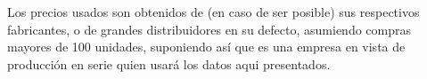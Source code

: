 Los precios usados son obtenidos de (en caso de ser posible) sus respectivos
fabricantes, o de grandes distribuidores en su defecto, asumiendo compras
mayores de 100 unidades, suponiendo as\'i que es una empresa en vista de
producci\'on en serie quien usar\'a los datos aqui presentados.



